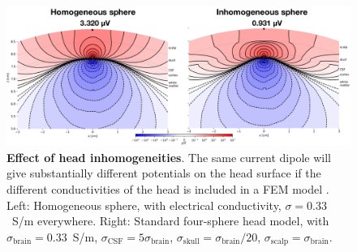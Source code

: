 \documentclass[preprint,11pt,authoryear]{elsarticle}
\begin{document}
\begin{itemize}
\begin{itemize}
\begin{figure}[!ht]
\begin{center}
\includegraphics[width=1.0\textwidth]{4o_contour}
\end{center}
\caption{\textbf{Effect of head inhomogeneities}.
The same current dipole will give substantially different potentials on the head surface if the different conductivities of the head is included in a FEM model  \citep{Naess2017}. Left: Homogeneous sphere, with electrical conductivity, $\sigma=0.33$~S/m everywhere. Right: Standard four-sphere head model, with $\sigma_{\text{brain}}=0.33$~S/m, $\sigma_{\text{CSF}}=5\sigma_{\text{brain}}$, 
$\sigma_{\text{skull}}=\sigma_{\text{brain}} / 20$, $\sigma_{\text{scalp}}=\sigma_{\text{brain}}$.
}
\label{fig:foursphere_contour}
\end{figure}


\end{itemize}
\end{itemize}
\end{document}
